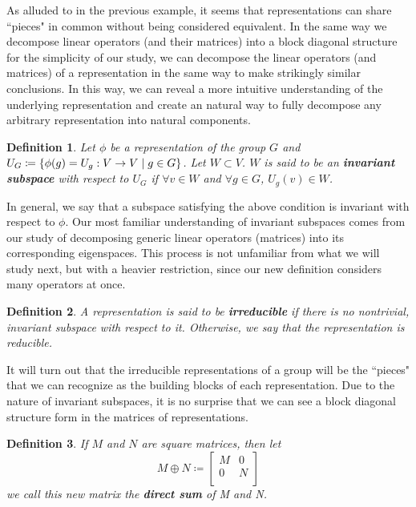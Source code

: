\documentclass[10pt]{ucthesis}
\newtheorem{definition}{Definition}[chapter]
\begin{document}
As alluded to in the previous example, it seems that representations can share ``pieces" in common without being considered equivalent. In the same way we decompose linear operators (and their matrices) into a block diagonal structure for the simplicity of our study, we can decompose the linear operators (and matrices) of a representation in the same way to make strikingly similar conclusions. In this way, we can reveal a more intuitive understanding of the underlying representation and create an natural way to fully decompose any arbitrary representation into natural components. 

\begin{definition}
	Let $\phi$ be a representation of the group $G$ and $U_G \coloneq \{\phi(g)=U_g: V\rightarrow V \hspace{1mm}| \hspace{1mm} g\in G\}$. Let $W \subset V$. $W$ is said to be an \textbf{invariant subspace} with respect to $U_G$ if $\forall v \in W$ and $\forall g \in G$, $U_g(v)\in W$.
\end{definition}

In general, we say that a subspace satisfying the above condition is invariant with respect to $\phi$. Our most familiar understanding of invariant subspaces comes from our study of decomposing generic linear operators (matrices) into its corresponding eigenspaces. This process is not unfamiliar from what we will study next, but with a heavier restriction, since our new definition considers many operators at once.

\begin{definition}
	A representation is said to be \textbf{irreducible} if there is no nontrivial, invariant subspace with respect to it. Otherwise, we say that the representation is reducible.
\end{definition}

It will turn out that the irreducible representations of a group will be the ``pieces" that we can recognize as the building blocks of each representation. Due to the nature of invariant subspaces, it is no surprise that we can see a block diagonal structure form in the matrices of representations.

\begin{definition}
	If $M$ and $N$ are square matrices, then let $$M\oplus N \coloneq \begin{bmatrix}
																			M & 0\\
																			0 & N\\
																		\end{bmatrix}$$
	we call this new matrix the \textbf{direct sum} of M and N.
\end{definition}
\end{document}
